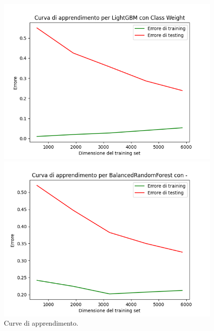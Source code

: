 \begin{figure}[H]
    \begin{minipage}[b]{0.45\linewidth}
      \centering
      \includegraphics[scale=0.5]{img/learning_curve_LightGBM_Class Weight.png}
      
    \end{minipage}
    \hfill
    \begin{minipage}[b]{0.45\linewidth}
      \centering
      \includegraphics[scale=0.5]{img/learning_curve_BalancedRandomForest_-.png}
      
    \end{minipage}
    \caption{Curve di apprendimento.}
    
    \end{figure}


